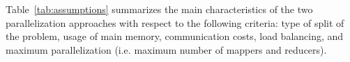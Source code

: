 Table~\ref{tab:assumptions} summarizes the main characteristics of the two parallelization approaches with respect to the following criteria: 
type of split of the problem, 
usage of main memory, 
communication costs, 
load balancing, 
and maximum parallelization (i.e. maximum number of mappers and reducers).




